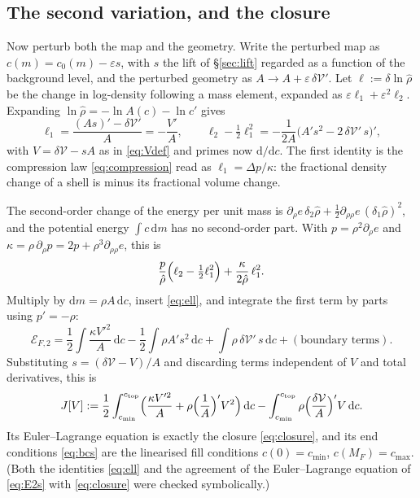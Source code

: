 \documentclass[11pt]{article}
\theoremstyle{definition}
\theoremstyle{remark}
\newcommand{\dc}{\,\mathrm{d}c}
\newcommand{\Vol}{\mathcal V}
\begin{document}
\subsection{The second variation, and the closure}
\label{sec:secondvar}

Now perturb both the map and the geometry. Write the perturbed map as
$c(m) = c_0(m) - \varepsilon s$, with $s$ the lift of \S\ref{sec:lift}
regarded as a function of the background level, and the perturbed
geometry as $A \to A + \varepsilon\,\delta\Vol'$. Let $\ell :=
\delta\ln\hat\rho$ be the change in log-density following a mass
element, expanded as $\varepsilon\ell_1 + \varepsilon^2\ell_2$.
Expanding $\ln\hat\rho = -\ln A(c) - \ln c'$ gives
\begin{equation}
  \ell_1 = \frac{(As)' - \delta\Vol'}{A} = -\frac{V'}{A},\qquad
  \ell_2 - \tfrac12\ell_1^2 = -\frac{1}{2A}\bigl(A's^2 - 2\,\delta\Vol'\,s\bigr)' ,
  \label{eq:ell}
\end{equation}
with $V = \delta\Vol - sA$ as in \eqref{eq:Vdef} and primes now
$\mathrm d/\mathrm dc$. The first identity is the compression law
\eqref{eq:compression} read as $\ell_1 = \Delta p/\kappa$: the
fractional density change of a shell is minus its fractional volume
change.

The second-order change of the energy per unit mass is $\partial_\rho
e\,\delta_2\hat\rho + \tfrac12\partial_{\rho\rho}e\,(\delta_1\hat\rho)^2$,
and the potential energy $\int c\,\mathrm dm$ has no second-order part.
With $p = \rho^2\partial_\rho e$ and $\kappa = \rho\,\partial_\rho p = 2p
+ \rho^3\partial_{\rho\rho}e$, this is
\begin{equation*}
  \frac{p}{\hat\rho}\Bigl(\ell_2 - \tfrac12\ell_1^2\Bigr)
  + \frac{\kappa}{2\hat\rho}\,\ell_1^2 .
\end{equation*}
Multiply by $\mathrm dm = \rho A\dc$, insert \eqref{eq:ell}, and
integrate the first term by parts using $p' = -\rho$:
\begin{equation}
  \mathcal E_{F,2} = \frac12\int\frac{\kappa V'^2}{A}\dc
  - \frac12\int\rho A's^2\dc + \int\rho\,\delta\Vol'\,s\dc
  + (\text{boundary terms}) .
  \label{eq:E2s}
\end{equation}
Substituting $s = (\delta\Vol - V)/A$ and discarding terms independent
of $V$ and total derivatives, this is
\begin{equation}
  J[V] := \frac12\int_{c_{\min}}^{c_{\mathrm{top}}}\Bigl(\frac{\kappa V'^2}{A}
  + \rho\Bigl(\frac1A\Bigr)'V^2\Bigr)\dc
  - \int_{c_{\min}}^{c_{\mathrm{top}}}\rho\Bigl(\frac{\delta\Vol}{A}\Bigr)'V\dc .
  \label{eq:J}
\end{equation}
Its Euler--Lagrange equation is exactly the closure \eqref{eq:closure},
and its end conditions \eqref{eq:bcs} are the linearised fill
conditions $c(0) = c_{\min}$, $c(M_F) = c_{\max}$. (Both the identities
\eqref{eq:ell} and the agreement of the Euler--Lagrange equation of
\eqref{eq:E2s} with \eqref{eq:closure} were checked symbolically.)
\end{document}
